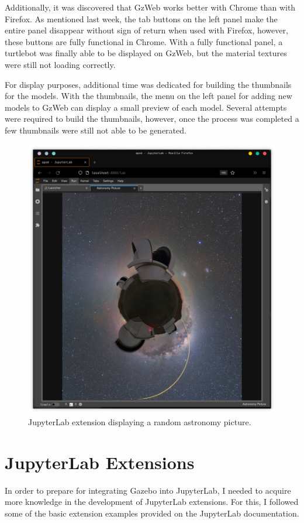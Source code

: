    Additionally, it was discovered that GzWeb works better with Chrome than with Firefox. As mentioned last week, the tab buttons on the left panel make the entire panel disappear without sign of return when used with Firefox, however, these buttons are fully functional in Chrome. With a fully functional panel, a turtlebot was finally able to be displayed on GzWeb, but the material textures were still not loading correctly.
    
    For display purposes, additional time was dedicated for building the thumbnails for the models. With the thumbnails, the menu on the left panel for adding new models to GzWeb can display a small preview of each model. Several attempts were required to build the thumbnails, however, once the process was completed a few thumbnails were still not able to be generated.
    
    
    \begin{figure}[ht]
        \centering
        \includegraphics[width=0.7\linewidth]{Images/05_astronomy.png}
        \caption{JupyterLab extension displaying a random astronomy picture.}
        \label{fig:astro}
    \end{figure}

\section{JupyterLab Extensions}
 
    In order to prepare for integrating Gazebo into JupyterLab, I needed to acquire more knowledge in the development of JupyterLab extensions. For this, I followed some of the basic extension examples provided on the JupyterLab documentation.

